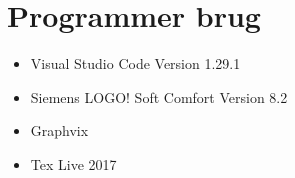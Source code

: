 \section{Programmer brug}
\begin{itemize}
    \item Visual Studio Code Version 1.29.1
    \item Siemens LOGO! Soft Comfort Version 8.2
    \item Graphvix
    \item Tex Live 2017
\end{itemize}